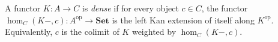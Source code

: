 A functor $K: A \to C$ is \emph{dense} if for every object $c \in C$, the functor $\hom_C(K-, c): A^{\mathrm{op}} \to \mathbf{Set}$ is the left Kan extension of itself along $K^{\mathrm{op}}$. Equivalently, $c$ is the colimit of $K$ weighted by $\hom_C(K-, c)$.
